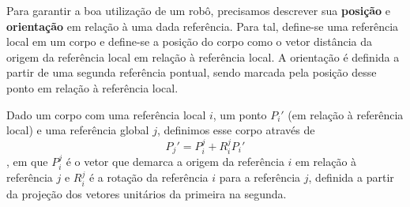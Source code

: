 
Para garantir a boa utilização de um robô, precisamos descrever sua \textbf{posição} e \textbf{orientação} em relação à uma dada referência. Para tal, define-se uma referência local em um corpo e define-se a posição do corpo como o vetor distância da origem da referência local em relação à referência local. A orientação é definida a partir de uma segunda referência pontual, sendo marcada pela posição desse ponto em relação à referência local.

\begin{definition}
    Dado um corpo com uma referência local $i$, um ponto $P_i'$ (em relação à referência local) e uma referência global $j$, definimos esse corpo através de \[
    P_j' = P_i^{j} + R_i^{j}P_i'
    \], em que $P_i^{j}$ é o vetor que demarca a origem da referência $i$ em relação à referência $j$ e  $R_i^{j}$ é a rotação da referência $i$ para a referência $j$, definida a partir da projeção dos vetores unitários da primeira na segunda.
\end{definition}

